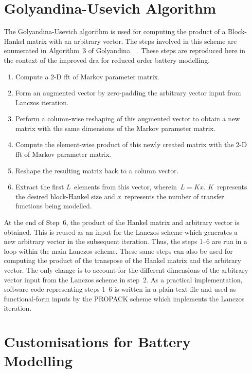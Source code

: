 \section{Golyandina-Usevich Algorithm\label{sec:Golyandina-Usevich-Algorithm}}

The  Golyandina-Usevich  algorithm  is  used  for computing  the  product  of  a
Block-Hankel matrix with an arbitrary vector.  The steps involved in this scheme
are enumerated  in Algorithm~3 of  Golyandina~\etal~\cite{Golyandina2015}. These
steps are reproduced  here in the context of the  improved \gls{dra} for reduced
order battery modelling.

\begin{enumerate}
	\item Compute a 2-D \gls{fft} of Markov parameter matrix.
	\item Form an augmented vector by zero-padding the arbitrary vector input
	    from Lanczos iteration.
	\item Perform a column-wise reshaping of this augmented vector to obtain
	    a new matrix with the same dimensions of the Markov parameter matrix.
	\item Compute the element-wise product of this newly created matrix with
	    the 2-D \gls{fft} of Markov parameter matrix.
	\item Reshape the resulting matrix back to a column vector.
	\item Extract the first $L$~elements from this vector, wherein~${L=K x}$.
	    $K$~represents the desired block-Hankel size and $x$~represents
	    the number of transfer functions being modelled.
\end{enumerate}

At the end of  Step~6, the product of the Hankel matrix  and arbitrary vector is
obtained. This is  reused as an input  for the Lanczos scheme  which generates a
new arbitrary vector  in the subsequent iteration. Thus, the  steps 1--6 are run
in a loop within the main Lanczos scheme.  These same steps can also be used for
computing the  product of the transpose  of the Hankel matrix  and the arbitrary
vector.  The only  change is  to  account for  the different  dimensions of  the
arbitrary  vector input  from  the  Lanczos scheme  in  step~2.  As a  practical
implementation, software code representing steps 1--6 is written in a plain-text
file and used  as functional-form inputs by the PROPACK  scheme which implements
the Lanczos iteration.

\section{Customisations for Battery Modelling}

